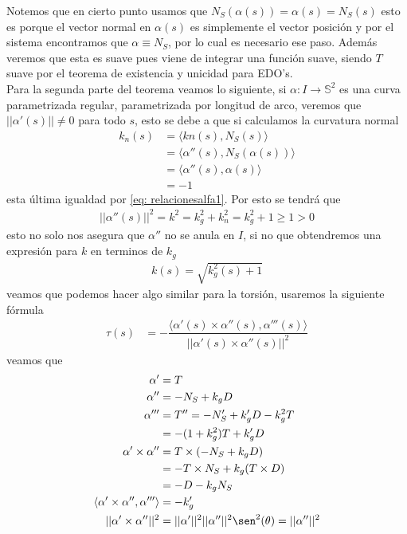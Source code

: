\documentclass[oneside,11pt]{memoir}
\begin{document}
Notemos que en cierto punto usamos que $N_S(\alpha(s))=\alpha(s)=N_S(s)$ esto es porque el vector normal en $\alpha(s)$ es simplemente el vector posición y por el sistema encontramos que $\alpha\equiv N_S$, por lo cual es necesario ese paso. Además veremos que esta es suave pues viene de integrar una función suave, siendo $T$ suave por el teorema de existencia y unicidad para EDO's.\\

Para la segunda parte del teorema veamos lo siguiente, si $\alpha:I\to \mathbb{S}^2$ es una curva parametrizada regular, parametrizada por longitud de arco, veremos que $||\alpha'(s)||\neq 0$ para todo $s$, esto se debe a que si calculamos la curvatura normal
\begin{align*}
    k_n(s)&=\langle kn(s), N_S(s) \rangle\\
       &=\langle \alpha''(s), N_S(\alpha(s)) \rangle\\
       &=\langle \alpha''(s), \alpha(s) \rangle\\
       &=-1
\end{align*}
esta última igualdad por \ref{eq: relacionesalfa1}. Por esto se tendrá que 
\begin{align*}
    ||\alpha''(s)||^2=k^2=k_g^2+k_n^2=k_g^2+1\geq 1 >0
\end{align*}
esto no solo nos asegura que $\alpha''$ no se anula en $I$, si no que obtendremos una expresión para $k$ en terminos de $k_g$
\begin{align}
    k(s)=\sqrt{k_g^2(s)+1} \label{eq: curvaturaenfunciondekg}
\end{align}
veamos que podemos hacer algo similar para la torsión, usaremos la siguiente fórmula
\begin{align*}
    \tau(s)&=-\dfrac{\langle\alpha'(s)\times \alpha''(s),\alpha'''(s)\rangle}{||\alpha'(s)\times \alpha''(s)||^2}
\end{align*}
veamos que
\begin{align*}
    \alpha'&=T\\
    \alpha''&=-N_S+k_gD\\
    \alpha'''&=T''=-N_S'+k_g'D-k_g^2T\\
    &=-(1+k_g^2)T+k_g'D\\
    \alpha'\times \alpha''&= T\times(-N_S+k_gD)\\
    &= -T\times N_S+k_g(T\times D)\\
    &= - D-k_gN_S\\
    \langle\alpha'\times \alpha'',\alpha'''\rangle&= -k_g'\\
    ||\alpha'\times \alpha''||^2&=||\alpha'||^2 ||\alpha''||^2\sen^2(\theta)=||\alpha''||^2
\end{align*} 
\end{document}
